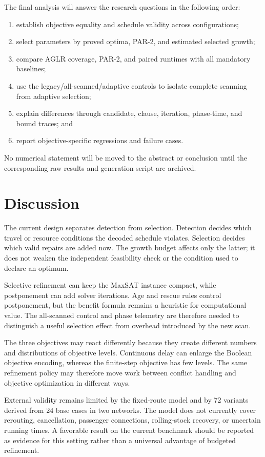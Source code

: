 \documentclass[preprint,12pt,authoryear]{elsarticle}
\begin{document}
The final analysis will answer the research questions in the following order:
\begin{enumerate}
\item establish objective equality and schedule validity across configurations;
\item select parameters by proved optima, PAR-2, and estimated selected growth;
\item compare AGLR coverage, PAR-2, and paired runtimes with all mandatory
baselines;
\item use the legacy/all-scanned/adaptive controls to isolate complete scanning
from adaptive selection;
\item explain differences through candidate, clause, iteration, phase-time, and
bound traces; and
\item report objective-specific regressions and failure cases.
\end{enumerate}
No numerical statement will be moved to the abstract or conclusion until the
corresponding raw results and generation script are archived.

\section{Discussion}
\label{sec:discussion}

The current design separates detection from selection. Detection decides which
travel or resource conditions the decoded schedule violates. Selection decides
which valid repairs are added now. The growth budget affects only the latter;
it does not weaken the independent feasibility check or the condition used to
declare an optimum.

Selective refinement can keep the MaxSAT instance compact, while postponement
can add solver iterations. Age and rescue rules control postponement, but the
benefit formula remains a heuristic for computational value. The
all-scanned control and phase telemetry are therefore needed to distinguish a
useful selection effect from overhead introduced by the new scan.

The three objectives may react differently because they create different
numbers and distributions of objective levels. Continuous delay can enlarge the
Boolean objective encoding, whereas the finite-step objective has few levels.
The same refinement policy may therefore move work between conflict handling
and objective optimization in different ways.

External validity remains limited by the fixed-route model and by 72 variants
derived from 24 base cases in two networks. The model does not currently cover
rerouting, cancellation, passenger connections, rolling-stock recovery, or
uncertain running times. A favorable result on the current benchmark should be
reported as evidence for this setting rather than a universal advantage of
budgeted refinement.
\end{document}
